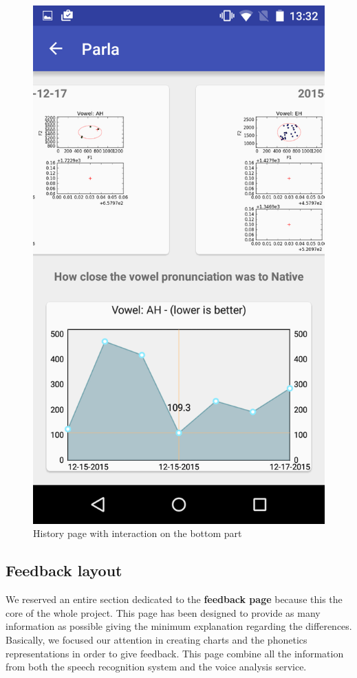 \begin{figure}[!ht]
\begin{minipage}{.5\textwidth}
		\includegraphics[scale=0.18]{Figures/screenshots/history.png}
		\caption{History page with interaction on the bottom part}
		\label{fig:history_page}
	\end{minipage}
\end{figure}

\subsection{Feedback layout}
\label{ssec:feedback_layout}
We reserved an entire section dedicated to the \textbf{feedback page} because this the core of the whole project. This page has been designed to provide as many information as possible giving the minimum explanation regarding the differences. Basically, we focused our attention in creating charts and the phonetics representations in order to give feedback. This page combine all the information from both the speech recognition system and the voice analysis service. \\


